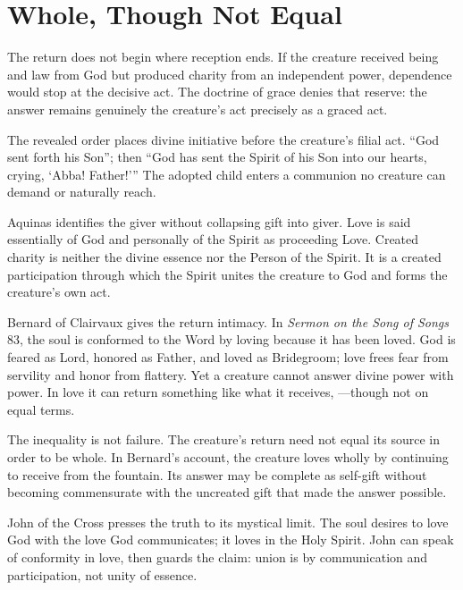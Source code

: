 \section{Whole, Though Not Equal}

The return does not begin where reception ends. If the creature received being and law from God but produced charity from an independent power, dependence would stop at the decisive act. The doctrine of grace denies that reserve: the answer remains genuinely the creature's act precisely as a graced act.

The revealed order places divine initiative before the creature's filial act. ``God sent forth his Son''; then ``God has sent the Spirit of his Son into our hearts, crying, `Abba! Father!'{}'' The adopted child enters a communion no creature can demand or naturally reach.

Aquinas identifies the giver without collapsing gift into giver. Love is said essentially of God and personally of the Spirit as proceeding Love. Created charity is neither the divine essence nor the Person of the Spirit. It is a created participation through which the Spirit unites the creature to God and forms the creature's own act.

Bernard of Clairvaux gives the return intimacy. In \emph{Sermon on the Song of Songs} 83, the soul is conformed to the Word by loving because it has been loved. God is feared as Lord, honored as Father, and loved as Bridegroom; love frees fear from servility and honor from flattery. Yet a creature cannot answer divine power with power. In love it can return something like what it receives, ---though not on equal terms.

The inequality is not failure. The creature's return need not equal its source in order to be whole. In Bernard's account, the creature loves wholly by continuing to receive from the fountain. Its answer may be complete as self-gift without becoming commensurate with the uncreated gift that made the answer possible.

John of the Cross presses the truth to its mystical limit. The soul desires to love God with the love God communicates; it loves in the Holy Spirit. John can speak of conformity in love, then guards the claim: union is by communication and participation, not unity of essence.

